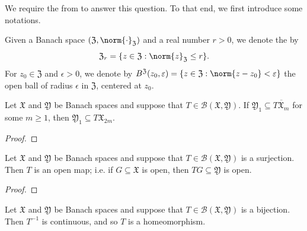 \documentclass[notoc,notitlepage]{tufte-book}
\begin{document}
We require the  from  to answer this question. To that end,
we first introduce some notations.

Given a Banach space $(\mathfrak{Z}, \norm{\cdot}_{\mathfrak{Z}})$
and a real number $r > 0$, we denote the  by
\begin{equation*}
  \mathfrak{Z}_r = \{ z \in \mathfrak{Z} : \norm{z}_{\mathfrak{Z}} \leq r \}.
\end{equation*}
For $z_0 \in \mathfrak{Z}$ and $\epsilon > 0$, we denote by
$B^{\mathfrak{Z}}(z_0, \epsilon) = \{ z \in \mathfrak{Z} : \norm{z - z_0} < \epsilon \}$
the open ball of radius $\epsilon$ in $\mathfrak{Z}$,
centered at $z_0$.

\begin{lemma}\label{lemma:finding_an_open_container_from_a_closed_container}
  Let $\mathfrak{X}$ and $\mathfrak{Y}$ be Banach spaces
  and suppose that $T \in \mathcal{B}(\mathfrak{X}, \mathfrak{Y})$.
  If $\mathfrak{Y}_1 \subseteq \overline{T \mathfrak{X}_m}$ for some $m \geq 1$,
  then $\mathfrak{Y}_1 \subseteq T \mathfrak{X}_{2m}$.
\end{lemma}

\begin{proof}
\end{proof}

\begin{thm}\label{thm:the_open_mapping_theorem}
  Let $\mathfrak{X}$ and $\mathfrak{Y}$ be Banach spaces and
  suppose that $T \in \mathcal{B}(\mathfrak{X}, \mathfrak{Y})$
  is a surjection.
  Then $T$ is an open map; i.e. if $G \subseteq \mathfrak{X}$ is open,
  then $TG \subseteq \mathfrak{Y}$ is open.
\end{thm}

\begin{proof}
\end{proof}

\begin{crly}\label{crly:the_inverse_mapping_theorem}
  Let $\mathfrak{X}$ and $\mathfrak{Y}$ be Banach spaces and
  suppose that $T \in \mathcal{B}(\mathfrak{X}, \mathfrak{Y})$ is a bijection.
  Then $T^{-1}$ is continuous, and so $T$ is a homeomorphism.
\end{crly}
\end{document}
